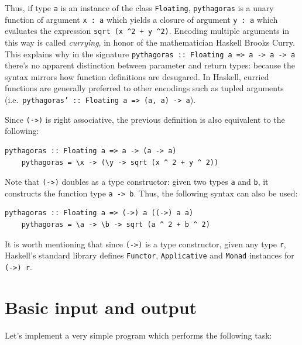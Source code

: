 \documentclass[UdineBachThesis,american,11pt]{PhdThesis}
\begin{document}
  Thus, if type \texttt{a} is an instance of the class \mbox{\texttt{Floating}},
  \mbox{\texttt{pythagoras}} is a unary function of argument
  \mbox{\texttt{x : a}} which yields a closure of argument \mbox{\texttt{y : a}}
  which evaluates the expression
  \mbox{\texttt{sqrt (x \textasciicircum 2 + y \textasciicircum 2)}}. Encoding
  multiple arguments in this way is called \emph{currying}, in honor of the
  mathematician Haskell Brooks Curry. This explains why in the signature
  \mbox{\texttt{pythagoras :: Floating a => a -> a -> a}} there's no apparent
  distinction between parameter and return types: because the syntax mirrors how
  function definitions are desugared. In Haskell, curried functions are
  generally preferred to other encodings such as tupled arguments (i.e.\
  \mbox{\texttt{pythagoras' :: Floating a => (a, a) -> a}}).

  Since \mbox{\texttt{(->)}} is right associative, the previous definition is
  also equivalent to the following:

  \begin{Verbatim}[gobble=4,fontsize=\small]
    pythagoras :: Floating a => a -> (a -> a)
    pythagoras = \x -> (\y -> sqrt (x ^ 2 + y ^ 2))
  \end{Verbatim}

  Note that \mbox{\texttt{(->)}} doubles as a type constructor: given two types
  \texttt{a} and \texttt{b}, it constructs the function type
  \mbox{\texttt{a -> b}}. Thus, the following syntax can also be used:

  \begin{Verbatim}[gobble=4,fontsize=\small]
    pythagoras :: Floating a => (->) a ((->) a a)
    pythagoras = \a -> \b -> sqrt (a ^ 2 + b ^ 2)
  \end{Verbatim}

  It is worth mentioning that since \mbox{\texttt{(->)}} is a type constructor,
  given any type \texttt{r}, Haskell's standard library defines
  \mbox{\texttt{Functor}}, \mbox{\texttt{Applicative}} and \mbox{\texttt{Monad}}
  instances for \mbox{\texttt{(->) r}}.

  \section{Basic input and output}

  Let's implement a very simple program which performs the following task:
\end{document}
